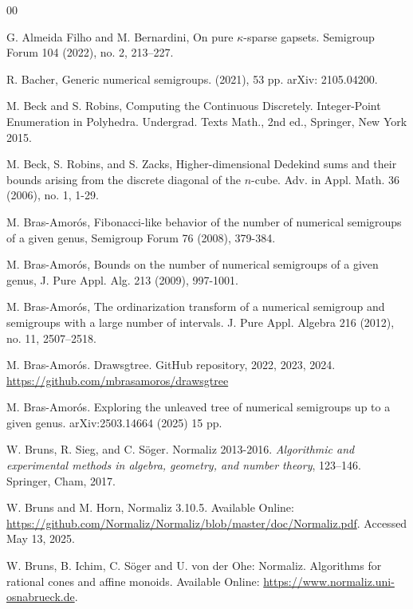 \documentclass[12pt]{amsart}
\theoremstyle{plain}\newtheorem{proposition}{Proposition}[section]
\begin{document}
\begin{thebibliography}{00}

 G. Almeida Filho and M. Bernardini, On pure $\kappa$-sparse gapsets. Semigroup Forum 104 (2022), no. 2, 213--227.

 R. Bacher, Generic numerical semigroups. (2021), 53 pp. arXiv: 2105.04200.

 M. Beck and S. Robins, Computing the Continuous Discretely. Integer-Point Enumeration in Polyhedra. Undergrad. Texts Math., 2nd ed., Springer, New York 2015.

 M. Beck, S. Robins, and S. Zacks, Higher-dimensional Dedekind sums and their bounds arising from the discrete diagonal of the $n$-cube. Adv. in Appl. Math. 36 (2006), no. 1, 1-29.

 M. Bras-Amor\'os, Fibonacci-like behavior of the number of numerical semigroups of a given genus, Semigroup Forum 76 (2008), 379-384.

 M. Bras-Amor\'os, Bounds on the number of numerical semigroups of a given genus, J. Pure Appl. Alg. 213 (2009), 997-1001.

 M. Bras-Amor\'os, The ordinarization transform of a numerical semigroup and semigroups with a large number of intervals.  J. Pure Appl. Algebra 216 (2012), no. 11, 2507--2518.


 M. Bras-Amor\'os. Drawsgtree. GitHub repository, 2022, 2023, 2024.\\
 \url{https://github.com/mbrasamoros/drawsgtree}
 
  M. Bras-Amor\'os. Exploring the unleaved tree of numerical semigroups up to a given genus. arXiv:2503.14664 (2025) 15 pp.

 W. Bruns, R. Sieg, and C. S\"oger. Normaliz 2013-2016. \emph{Algorithmic and experimental methods in algebra, geometry, and number theory}, 123--146. Springer, Cham, 2017.

 W. Bruns and M. Horn, Normaliz 3.10.5. Available Online: \\
\url{https://github.com/Normaliz/Normaliz/blob/master/doc/Normaliz.pdf}.  Accessed May 13, 2025.

 W. Bruns, B. Ichim, C. S\"oger and U. von der Ohe: Normaliz. Algorithms for rational cones and affine monoids. Available Online: \url{https://www.normaliz.uni-osnabrueck.de}.


\end{thebibliography}
\end{document}
